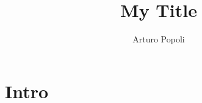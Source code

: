 \documentclass{article}
\title{\textbf{My Title}}
\author{Arturo Popoli}
\begin{document}
	
	\maketitle
	
	\section{Intro}
	
\end{document}
